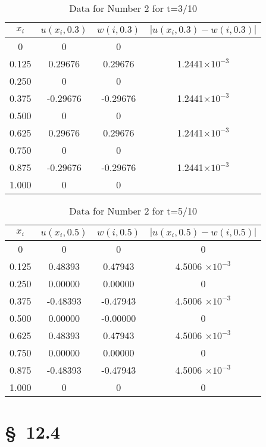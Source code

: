 \documentclass[12pt]{article}
\begin{document}
\begin{table}[H]
  \centering
  \begin{tabular}[p]{cccc}
    \hline
    $x_i$ & $u(x_i,0.3)$ & $w(i,0.3)$ & $|u(x_i,0.3)-w(i,0.3)|$ \\
    \hline
    0 & 0 & 0 & \\
    0.125 &  0.29676 &  0.29676 & 1.2441$\times 10^{-3}$ \\
    0.250 &  0 & 0 \\
    0.375 & -0.29676 & -0.29676 & 1.2441$\times 10^{-3}$ \\
    0.500 &  0 & 0 \\
    0.625 &  0.29676 &  0.29676 & 1.2441$\times 10^{-3}$ \\
    0.750 &  0 & 0 \\
    0.875 & -0.29676 & -0.29676 & 1.2441$\times 10^{-3}$ \\
    1.000 &  0 & 0 & \\
    \hline
  \end{tabular}
  \caption{Data for Number 2 for t=3/10}
  \label{tab:2_1}
\end{table}

\begin{table}[H]
  \centering
  \begin{tabular}[p]{cccc}
    \hline
    $x_i$ & $u(x_i,0.5)$ & $w(i,0.5)$ & $|u(x_i,0.5)-w(i,0.5)|$ \\
    \hline
    0 & 0 & 0 & 0 \\
    0.125 &  0.48393 &  0.47943 & 4.5006 $\times 10^{-3}$ \\
    0.250 &  0.00000 &  0.00000 & 0 \\
    0.375 & -0.48393 & -0.47943 & 4.5006 $\times 10^{-3}$ \\
    0.500 &  0.00000 & -0.00000 & 0 \\
    0.625 &  0.48393 &  0.47943 & 4.5006 $\times 10^{-3}$ \\
    0.750 &  0.00000 &  0.00000 & 0 \\
    0.875 & -0.48393 & -0.47943 & 4.5006 $\times 10^{-3}$ \\
    1.000 & 0 & 0 & 0 \\
    \hline
  \end{tabular}
  \caption{Data for Number 2 for t=5/10}
  \label{tab:2_2}
\end{table}

\section{\S~12.4}
\end{document}
